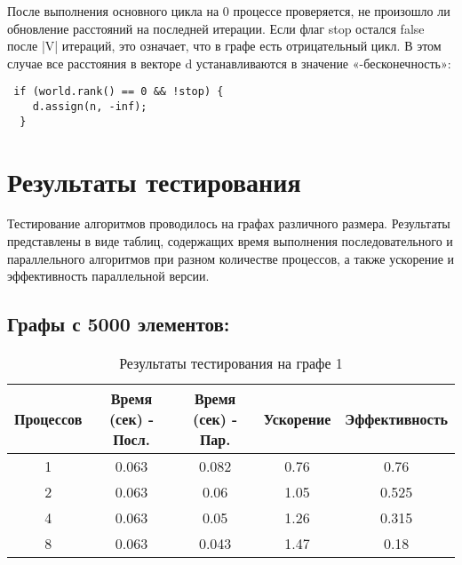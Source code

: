 \documentclass[a4paper, 14pt]{article}
\begin{document}
После выполнения основного цикла на 0 процессе проверяется, не произошло ли обновление расстояний на последней итерации. Если флаг stop остался false после |V| итераций, это означает, что в графе есть отрицательный цикл. В этом случае все расстояния в векторе d устанавливаются в значение «-бесконечность»:
	\vspace{-1em}
	\begin{verbatim}
 if (world.rank() == 0 && !stop) {
    d.assign(n, -inf);
  }
	\end{verbatim}	




    
	\newpage

    \section*{\centering Результаты тестирования}


\indent Тестирование алгоритмов проводилось на графах различного размера. Результаты представлены в виде таблиц, содержащих время выполнения последовательного и параллельного алгоритмов при разном количестве процессов, а также ускорение и эффективность параллельной версии.

\subsection*{Графы с 5000 элементов:}
\begin{table}[h]
    \centering
    \begin{tabular}{|c|c|c|c|c|}
        \hline
        Процессов & Время (сек) - Посл. & Время (сек) - Пар. & Ускорение & Эффективность \\ \hline
        1         &  0.063       &   0.082     &     0.76    & 0.76      \\ \hline
        2         &   0.063      &  0.06      &      1.05   &  0.525    \\ \hline
        4         &   0.063      &  0.05      &     1.26    & 0.315     \\ \hline
		8         &   0.063      &  0.043     &     1.47   &  0.18   \\ \hline
    \end{tabular}
    \caption{Результаты тестирования на графе 1}
\end{table}
\end{document}
